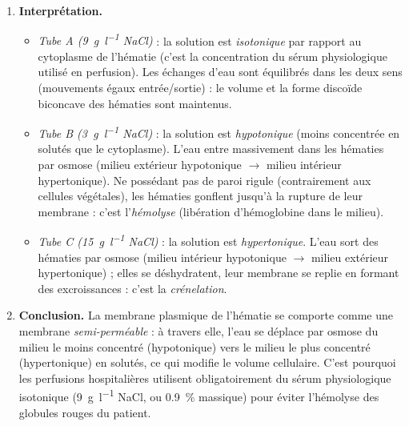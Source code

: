\documentclass[11pt]{article}
\newcommand{\cle}[1]{{\popxbold\color{popdark}#1}}
\begin{document}
\begin{exoresolu}
\begin{enumerate}
\item \textbf{Interprétation.}
\begin{itemize}
\item \emph{Tube A (\SI{9}{\gram\per\litre} NaCl)} : la solution est \emph{isotonique} par rapport au cytoplasme de l'hématie (c'est la concentration du sérum physiologique utilisé en perfusion). Les échanges d'eau sont équilibrés dans les deux sens (mouvements égaux entrée/sortie) : le volume et la forme discoïde biconcave des hématies sont maintenus.
\item \emph{Tube B (\SI{3}{\gram\per\litre} NaCl)} : la solution est \emph{hypotonique} (moins concentrée en solutés que le cytoplasme). L'eau entre massivement dans les hématies par \cle{osmose} (milieu extérieur hypotonique $\to$ milieu intérieur hypertonique). Ne possédant pas de paroi rigule (contrairement aux cellules végétales), les hématies gonflent jusqu'à la rupture de leur membrane : c'est l'\emph{hémolyse} (libération d'hémoglobine dans le milieu).
\item \emph{Tube C (\SI{15}{\gram\per\litre} NaCl)} : la solution est \emph{hypertonique}. L'eau sort des hématies par osmose (milieu intérieur hypotonique $\to$ milieu extérieur hypertonique) ; elles se déshydratent, leur membrane se replie en formant des excroissances : c'est la \emph{crénelation}.
\end{itemize}
\item \textbf{Conclusion.} La membrane plasmique de l'hématie se comporte comme une membrane \emph{semi-perméable} : à travers elle, l'eau se déplace par osmose du milieu le moins concentré (hypotonique) vers le milieu le plus concentré (hypertonique) en solutés, ce qui modifie le volume cellulaire. C'est pourquoi les perfusions hospitalières utilisent obligatoirement du sérum physiologique isotonique (\SI{9}{\gram\per\litre} NaCl, ou \SI{0,9}{\%} massique) pour éviter l'hémolyse des globules rouges du patient.
\end{enumerate}
\end{exoresolu}
\end{document}
